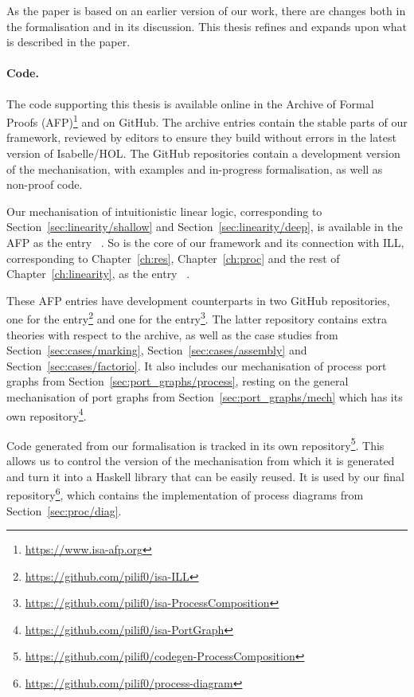 \documentclass[class=smolathesis,crop=false]{standalone}
\begin{document}
As the paper is based on an earlier version of our work, there are changes both in the formalisation and in its discussion.
This thesis refines and expands upon what is described in the paper.

\cbstart
\paragraph*{Code.}
The code supporting this thesis is available online in the Archive of Formal Proofs (AFP)\footnote{\url{https://www.isa-afp.org}} and on GitHub.
The archive entries contain the stable parts of our framework, reviewed by editors to ensure they build without errors in the latest version of Isabelle/HOL\@.
The GitHub repositories contain a development version of the mechanisation, with examples and in-progress formalisation, as well as non-proof code.

Our mechanisation of intuitionistic linear logic, corresponding to Section~\ref{sec:linearity/shallow} and Section~\ref{sec:linearity/deep}, is available in the AFP as the entry ~\cite{ILL-AFP}.
So is the core of our framework and its connection with ILL, corresponding to Chapter~\ref{ch:res}, Chapter~\ref{ch:proc} and the rest of Chapter~\ref{ch:linearity}, as the entry ~\cite{ProcessComposition-AFP}.

These AFP entries have development counterparts in two GitHub repositories, one for the  entry\footnote{\url{https://github.com/pilif0/isa-ILL}} and one for the  entry\footnote{\url{https://github.com/pilif0/isa-ProcessComposition}}.
The latter repository contains extra theories with respect to the archive, as well as the case studies from Section~\ref{sec:cases/marking}, Section~\ref{sec:cases/assembly} and Section~\ref{sec:cases/factorio}.
It also includes our mechanisation of process port graphs from Section~\ref{sec:port_graphs/process}, resting on the general mechanisation of port graphs from Section~\ref{sec:port_graphs/mech} which has its own repository\footnote{\url{https://github.com/pilif0/isa-PortGraph}}.

Code generated from our formalisation is tracked in its own repository\footnote{\url{https://github.com/pilif0/codegen-ProcessComposition}}.
This allows us to control the version of the mechanisation from which it is generated and turn it into a Haskell library that can be easily reused.
It is used by our final repository\footnote{\url{https://github.com/pilif0/process-diagram}}, which contains the implementation of process diagrams from Section~\ref{sec:proc/diag}.
\cbend
\end{document}
